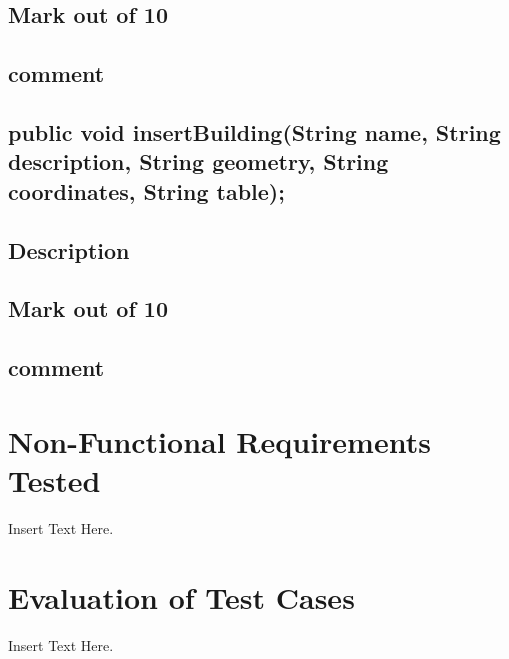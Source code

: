 \documentclass[12pt]{article}
\begin{document}
			\subsection{Mark out of 10}     
			\subsection{comment}                    
		\subsection {	public void insertBuilding(String name, String description, String geometry, String coordinates, String table);}
			\subsection{Description}
			\subsection{Mark out of 10}     
			\subsection{comment}
		



\section{Non-Functional Requirements Tested}
Insert Text Here.

\section{Evaluation of Test Cases}
Insert Text Here.
\end{document}
